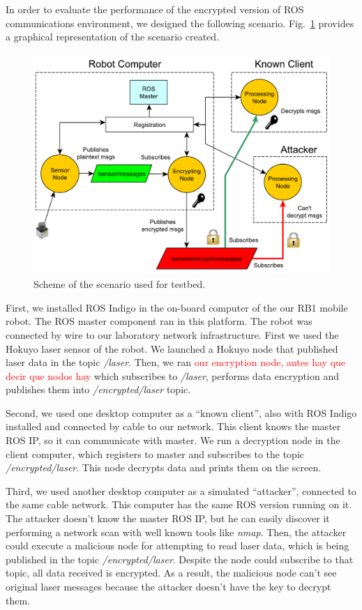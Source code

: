 \documentclass[journal,twoside]{JoPhA}
\begin{document}
In order to evaluate the performance of the encrypted  version of ROS communications environment, we designed the following scenario.
Fig.~\ref{fig:TestBed} provides a graphical representation of the scenario created.


\begin{figure}[ht]
	\centering
	\includegraphics[width=.5\textwidth]{TestBed_complete.pdf}
	\caption{Scheme of the scenario used for testbed.}
	\label{fig:TestBed}
\end{figure}


First, we installed ROS Indigo in the on-board computer of the our RB1 mobile robot. The ROS master component ran in this platform. The robot was connected by wire to our laboratory network infrastructure. First we used the Hokuyo laser sensor of the robot. We launched a Hokuyo node that published laser data in the topic \textit{/laser}. Then, we ran {\textcolor{red}{our encryption node, antes hay que decir que nodos hay}} which subscribes to \textit{/laser}, performs data encryption and publishes them into \textit{/encrypted/laser} topic.

Second, we used one desktop computer as a ``known client'', also with ROS Indigo installed and connected by cable to our network. This client knows the master ROS IP, so it can communicate with master. We run a decryption node in the client computer, which registers to master and subscribes to the topic \textit{/encrypted/laser}. This node decrypts data and prints them on the screen.

Third, we used another desktop computer as a simulated ``attacker'', connected to the same  cable network. This computer has the same ROS version running on it. The attacker doesn't know the master ROS IP, but he can easily discover it performing a network scan with well known tools like \textit{nmap}. Then, the attacker could execute a malicious node for attempting to read laser data, which is being published in the topic \textit{/encrypted/laser}. Despite the node could subscribe to that topic, all data received is encrypted. As a result, the malicious node can't see original laser messages because the attacker doesn't have the key to decrypt them. 
\end{document}
